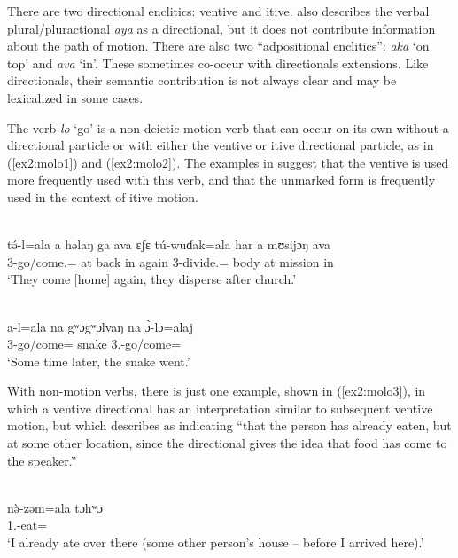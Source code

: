 There are two directional enclitics: ventive and itive. \citet[239]{friesenGrammarMoloko2017} also describes the verbal plural/pluractional \textit{aya} as a directional, but it does not contribute information about the path of motion. There are also two “adpositional enclitics”: \textit{aka} ‘on top’ and \textit{ava} ‘in’. These sometimes co-occur with directionals extensions. Like directionals, their semantic contribution is not always clear and may be lexicalized in some cases.

The verb \textit{lo} ‘go’ is a non-deictic motion verb that can occur on its own without a directional particle or with either the ventive or itive directional particle, as in (\ref{ex2:molo1}) and (\ref{ex2:molo2}). The examples in \citet{friesenGrammarMoloko2017} suggest that the ventive is used more frequently used with this verb, and that the unmarked form is frequently used in the context of itive motion.

\ea\label{ex2:molo1}
 \\
\gll tə́-l=ala	a	həlaŋ	ga	ava	ɛʃɛ	tú-wuɗak=ala	har	a	mʊsijɔŋ	ava\\
3-go/come.=	at	back		in	again	3-divide.=	body at	mission	in \\
\glt `They come [home] again, they disperse after church.'

\ex\label{ex2:molo2}
 \\
\gll a-l=ala	na	gʷɔgʷɔlvaŋ	na	ɔ̀-lɔ=alaj\\
3-go/come=		snake		3.-go/come= \\
\glt `Some time later, the snake went.'
\z 

With non-motion verbs, there is just one example, shown in (\ref{ex2:molo3}), in which a ventive directional has an interpretation similar to subsequent ventive motion, but which \citet[242]{friesenGrammarMoloko2017} describes as indicating ``that the person has already eaten, but at some other location, since the directional gives the idea that food has come to the speaker.''

\ea\label{ex2:molo3}
 \\
\gll nə̀-zəm=ala	tɔhʷɔ \\
1.-eat=	 \\
\glt `I already ate over there (some other person’s house – before I arrived here).'
\z 

